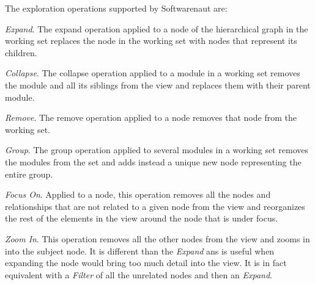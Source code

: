 \documentclass[preprint,12pt]{elsarticle}
\begin{document}
The exploration operations supported by Softwarenaut are:

\begin{description}

\item {\em Expand}. The expand operation applied to a node of the hierarchical graph in the working set replaces the node in the working set with nodes that represent its children. 

%
%
%
\item {\em Collapse}. The collapse operation applied to a module in a working set removes the module and all its siblings from the view and replaces them with their parent module. 

%
%
%
\item {\em Remove}. The remove operation applied to a node removes that node from the working set. 

%
%

\item {\em Group}. The group operation applied to several modules in a working set removes the modules from the set and adds instead a unique new node representing the entire group. 

\item {\em Focus On}. Applied to a node, this operation removes all the nodes and relationships that are not related to a given node from the view and reorganizes the rest of the elements in the view around the node that is under focus.

\item {\em Zoom In}. This operation removes all the other nodes from the view and zooms in into the subject node. It is different than the {\em Expand} ans is useful when expanding the node would bring too much detail into the view. It is in fact equivalent with a {\em Filter} of all the unrelated nodes and then an {\em Expand}.

%
%
%
\end{description}
\end{document}
